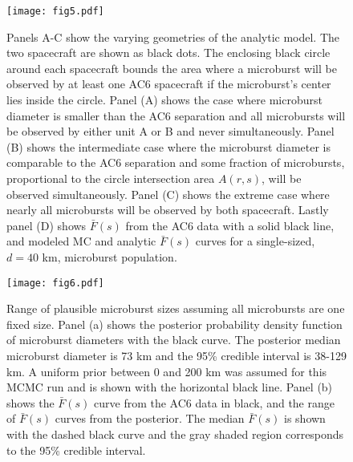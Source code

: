 \documentclass[draft]{agujournal2019}
\begin{document}
\begin{figure}
\texttt{[image: fig5.pdf]}
\caption{Panels A-C show the varying geometries of the analytic model. The two spacecraft are shown as black dots. The enclosing black circle around each spacecraft bounds the area where a microburst will be observed by at least one AC6 spacecraft if the microburst's center lies inside the circle. Panel (A) shows the case where microburst diameter is smaller than the AC6 separation and all microbursts will be observed by either unit A or B and never simultaneously. Panel (B) shows the intermediate case where the microburst diameter is comparable to the AC6 separation and some fraction of microbursts, proportional to the circle intersection area $A(r, s)$, will be observed simultaneously. Panel (C) shows the extreme case where nearly all microbursts will be observed by both spacecraft. Lastly panel (D) shows $\bar{F}(s)$ from the AC6 data with a solid black line, and modeled MC and analytic $\bar{F}(s)$ curves for a single-sized, $d = 40$ km,  microburst population.} 
\label{fig5}
\end{figure}

\begin{figure}
\texttt{[image: fig6.pdf]}
\caption{Range of plausible microburst sizes assuming all microbursts are one fixed size. Panel (a) shows the posterior probability density function of microburst diameters with the black curve. The posterior median microburst diameter is 73 km and the 95\% credible interval is 38-129 km. A uniform prior between 0 and 200 km was assumed for this MCMC run and is shown with the horizontal black line. Panel (b) shows the $\bar{F}(s)$ curve from the AC6 data in black, and the range of $\bar{F}(s)$ curves from the posterior. The median $\bar{F}(s)$ is shown with the dashed black curve and the gray shaded region corresponds to the 95\% credible interval.} 
\label{fig6}
\end{figure}
\end{document}
